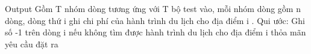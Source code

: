 Output
Gồm T nhóm dòng tương ứng với T bộ test vào, mỗi nhóm dòng gồm n dòng, dòng thứ i ghi chi phí của hành trình du lịch cho địa điểm i . Qui ước: Ghi số -1 trên dòng i nếu không tìm được hành trình du lịch cho địa điểm i thỏa mãn yêu cầu đặt ra